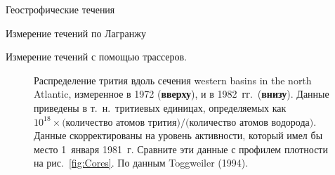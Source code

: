 \begin{chapter}{Геострофические течения}
\begin{section}{Измерение течений по Лагранжу}
\begin{paragraph}{Измерение течений с помощью трассеров.}
\begin{figure}[t!]
\caption{Распределение трития вдоль сечения western basins 
in the north Atlantic, измеренное в 1972 (\textbf{вверху}), и в 1982~гг.\ 
(\textbf{внизу}). 
Данные приведены в т.~н.\ тритиевых единицах, определяемых как 
$10^{18}\times \text{(количество атомов трития)}/
\text{(количество атомов водорода)}$. Данные скорректированы на уровень 
активности, который имел бы место 1~января 1981~г. Сравните эти данные 
с профилем плотности на рис.~\ref{fig:Cores}. По данным Toggweiler (1994).}
\label{fig:tritium}
\end{figure}
%


\end{paragraph}
\end{section}
\end{chapter}
